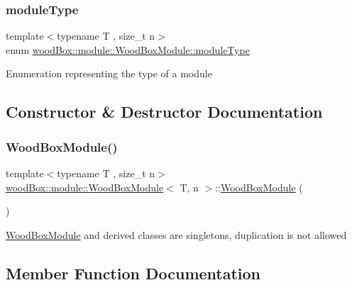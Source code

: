 \subsubsection{\texorpdfstring{module\+Type}{moduleType}}
{\footnotesize\ttfamily template$<$typename T , size\+\_\+t n$>$ \\
enum \mbox{\hyperlink{classwood_box_1_1module_1_1_wood_box_module_af74476c8a785de7fe587c4fb68435673}{wood\+Box\+::module\+::\+Wood\+Box\+Module\+::module\+Type}}}

Enumeration representing the type of a module 

\subsection{Constructor \& Destructor Documentation}
\mbox{\label{classwood_box_1_1module_1_1_wood_box_module_ade3d82ff1e508da2ad37185c208f9333}} 
\subsubsection{\texorpdfstring{Wood\+Box\+Module()}{WoodBoxModule()}}
{\footnotesize\ttfamily template$<$typename T , size\+\_\+t n$>$ \\
\mbox{\hyperlink{classwood_box_1_1module_1_1_wood_box_module}{wood\+Box\+::module\+::\+Wood\+Box\+Module}}$<$ T, n $>$\+::\mbox{\hyperlink{classwood_box_1_1module_1_1_wood_box_module}{Wood\+Box\+Module}} (\begin{DoxyParamCaption}\item[{const \mbox{\hyperlink{classwood_box_1_1module_1_1_wood_box_module}{Wood\+Box\+Module}}$<$ T, n $>$ \&}]{ }\end{DoxyParamCaption})\hspace{0.3cm}{\ttfamily [delete]}}

\mbox{\hyperlink{classwood_box_1_1module_1_1_wood_box_module}{Wood\+Box\+Module}} and derived classes are singletons, duplication is not allowed 

\subsection{Member Function Documentation}
\mbox{\label{classwood_box_1_1module_1_1_wood_box_module_a3f13bd3a6318ddf2a7db84f86b198a49}} 
